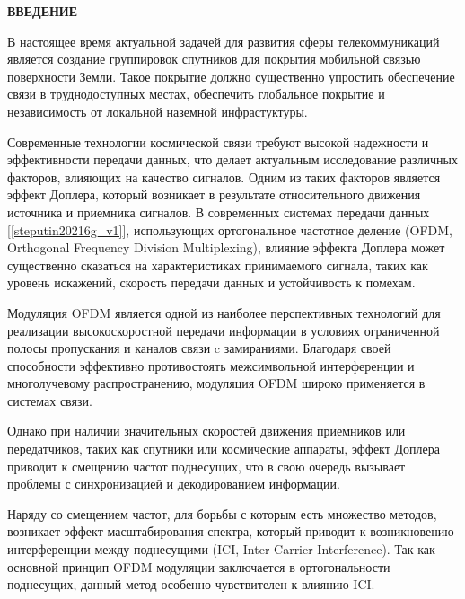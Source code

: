 \newpage
\begin{center}
  \textbf{\large ВВЕДЕНИЕ}
\end{center}

В настоящее время актуальной задачей для развития сферы телекоммуникаций
является создание группировок спутников для покрытия мобильной связью 
поверхности Земли. Такое покрытие должно существенно упростить обеспечение
связи в труднодоступных местах, обеспечить глобальное покрытие и 
независимость от локальной наземной инфрастуктуры.

Современные технологии космической связи требуют высокой надежности и
эффективности передачи данных, что делает актуальным исследование
различных факторов, влияющих на качество сигналов. Одним из таких факторов
является эффект Доплера, который возникает в результате относительного
движения источника и приемника сигналов. В современных системах передачи
данных [\ref{steputin20216g_v1}],
использующих ортогональное частотное деление (OFDM,
Orthogonal Frequency Division Multiplexing), влияние эффекта Доплера может
существенно сказаться на характеристиках принимаемого сигнала, таких как
уровень искажений, скорость передачи данных и устойчивость к помехам.

Модуляция OFDM является одной из наиболее перспективных технологий для
реализации высокоскоростной передачи информации в условиях ограниченной
полосы пропускания и каналов связи c замираниями. Благодаря своей способности
эффективно противостоять межсимвольной интерференции и многолучевому
распространению, модуляция OFDM широко применяется в системах связи.

Однако при
наличии значительных скоростей движения приемников или передатчиков,
таких как спутники или космические аппараты, эффект Доплера приводит к
смещению частот поднесущих,
 что в свою очередь вызывает проблемы с
синхронизацией и декодированием информации.

Наряду со смещением частот, для борьбы с которым есть множество методов,
возникает эффект масштабирования спектра, который приводит к возникновению
интерференции между поднесущими (ICI, Inter Carrier Interference).
Так как основной принцип OFDM модуляции заключается в ортогональности
поднесущих, данный метод особенно чувствителен к влиянию ICI.

